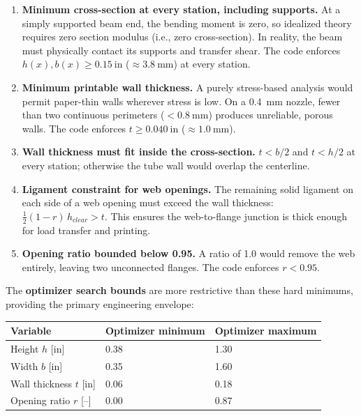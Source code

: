 \documentclass[11pt,letterpaper]{article}
\begin{document}
\begin{enumerate}
  \item \textbf{Minimum cross-section at every station, including supports.}
    At a simply supported beam end, the bending moment is zero, so idealized
    theory requires zero section modulus (i.e., zero cross-section).  In
    reality, the beam must physically contact its supports and transfer shear.
    The code enforces $h(x), b(x) \ge 0.15\ \mathrm{in}$ ($\approx 3.8\ \mathrm{mm}$)
    at every station.

  \item \textbf{Minimum printable wall thickness.}
    A purely stress-based analysis would permit paper-thin walls wherever
    stress is low.  On a 0.4~mm nozzle, fewer than two continuous perimeters
    ($< 0.8\ \mathrm{mm}$) produces unreliable, porous walls.  The code
    enforces $t \ge 0.040\ \mathrm{in}$ ($\approx 1.0\ \mathrm{mm}$).

  \item \textbf{Wall thickness must fit inside the cross-section.}
    $t < b/2$ and $t < h/2$ at every station; otherwise the tube wall
    would overlap the centerline.

  \item \textbf{Ligament constraint for web openings.}
    The remaining solid ligament on each side of a web opening must exceed
    the wall thickness: $\tfrac{1}{2}(1 - r)\,h_{clear} > t$.  This ensures
    the web-to-flange junction is thick enough for load transfer and printing.

  \item \textbf{Opening ratio bounded below 0.95.}
    A ratio of 1.0 would remove the web entirely, leaving two unconnected
    flanges.  The code enforces $r < 0.95$.
\end{enumerate}

The \textbf{optimizer search bounds} are more restrictive than these hard
minimums, providing the primary engineering envelope:

\begin{center}
\begin{tabular}{lll}
\toprule
Variable & Optimizer minimum & Optimizer maximum \\
\midrule
Height $h$ [in]         & 0.38 & 1.30 \\
Width $b$ [in]          & 0.35 & 1.60 \\
Wall thickness $t$ [in] & 0.06 & 0.18 \\
Opening ratio $r$ [--]  & 0.00 & 0.87 \\
\bottomrule
\end{tabular}
\end{center}
\end{document}
